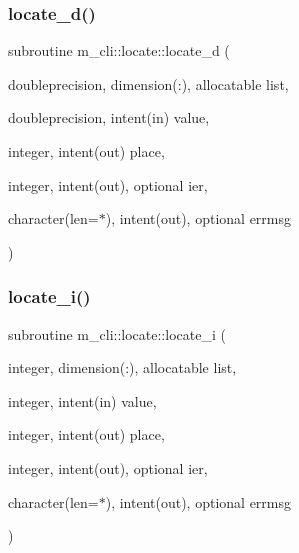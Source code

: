 \mbox{\label{interfacem__cli_1_1locate_a71019028d011617570317ae09899b86a}} 
\subsubsection{\texorpdfstring{locate\+\_\+d()}{locate\_d()}}
{\footnotesize\ttfamily subroutine m\+\_\+cli\+::locate\+::locate\+\_\+d (\begin{DoxyParamCaption}\item[{doubleprecision, dimension(\+:), allocatable}]{list,  }\item[{doubleprecision, intent(in)}]{value,  }\item[{integer, intent(out)}]{place,  }\item[{integer, intent(out), optional}]{ier,  }\item[{character(len=$\ast$), intent(out), optional}]{errmsg }\end{DoxyParamCaption})\hspace{0.3cm}{\ttfamily [private]}}

\mbox{\label{interfacem__cli_1_1locate_af977558244f03daa06eef8520a5475cc}} 
\subsubsection{\texorpdfstring{locate\+\_\+i()}{locate\_i()}}
{\footnotesize\ttfamily subroutine m\+\_\+cli\+::locate\+::locate\+\_\+i (\begin{DoxyParamCaption}\item[{integer, dimension(\+:), allocatable}]{list,  }\item[{integer, intent(in)}]{value,  }\item[{integer, intent(out)}]{place,  }\item[{integer, intent(out), optional}]{ier,  }\item[{character(len=$\ast$), intent(out), optional}]{errmsg }\end{DoxyParamCaption})\hspace{0.3cm}{\ttfamily [private]}}

